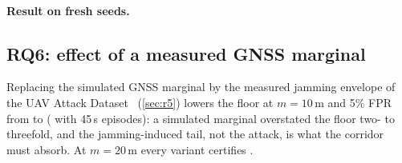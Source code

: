 \paragraph{Result on fresh seeds.}


\subsection{RQ6: effect of a measured GNSS marginal}
Replacing the simulated GNSS marginal by the measured jamming envelope of the UAV
Attack Dataset~\cite{whelan2020dataset} (\cref{sec:r5}) lowers the floor at
$m=10$\,m and 5\% FPR from \nRFiveFloorSim{} to \nRFiveFloorMeas{}
(\nRFiveFloorLong{} with 45\,s episodes): a simulated marginal overstated the floor
two- to threefold, and the jamming-induced tail, not the attack, is what the
corridor must absorb. At $m=20$\,m every variant certifies \nRFiveFloorCpTwenty.
